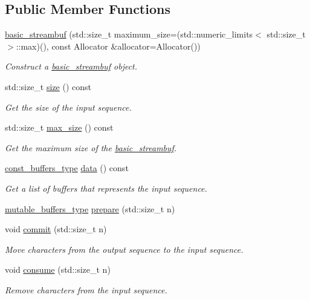 \subsection*{Public Member Functions}
\begin{DoxyCompactItemize}
\item 
\hyperlink{classasio_1_1basic__streambuf_ae170fa1aa36003d7bf294b18d95559a8}{basic\+\_\+streambuf} (std\+::size\+\_\+t maximum\+\_\+size=(std\+::numeric\+\_\+limits$<$ std\+::size\+\_\+t $>$\+::max)(), const Allocator \&allocator=Allocator())
\begin{DoxyCompactList}\small\item\em Construct a \hyperlink{classasio_1_1basic__streambuf}{basic\+\_\+streambuf} object. \end{DoxyCompactList}\item 
std\+::size\+\_\+t \hyperlink{classasio_1_1basic__streambuf_a18183b8bfcb9a7cda8c467c80d578e69}{size} () const 
\begin{DoxyCompactList}\small\item\em Get the size of the input sequence. \end{DoxyCompactList}\item 
std\+::size\+\_\+t \hyperlink{classasio_1_1basic__streambuf_aee4f81154657df05c5c01cc732fe8a3a}{max\+\_\+size} () const 
\begin{DoxyCompactList}\small\item\em Get the maximum size of the \hyperlink{classasio_1_1basic__streambuf}{basic\+\_\+streambuf}. \end{DoxyCompactList}\item 
\hyperlink{classasio_1_1basic__streambuf_a6318f8e7cef616d25207918033f02bc9}{const\+\_\+buffers\+\_\+type} \hyperlink{classasio_1_1basic__streambuf_a0bcecbf99eb1d32613738a73db9de4c9}{data} () const 
\begin{DoxyCompactList}\small\item\em Get a list of buffers that represents the input sequence. \end{DoxyCompactList}\item 
\hyperlink{classasio_1_1basic__streambuf_a4d2090a05e1d13270b4e30d848517272}{mutable\+\_\+buffers\+\_\+type} \hyperlink{classasio_1_1basic__streambuf_a4f19d44bcf40de432f9e6984df959e73}{prepare} (std\+::size\+\_\+t n)
\item 
void \hyperlink{classasio_1_1basic__streambuf_a6d01805ae2a9382cbb81934111c8ea1c}{commit} (std\+::size\+\_\+t n)
\begin{DoxyCompactList}\small\item\em Move characters from the output sequence to the input sequence. \end{DoxyCompactList}\item 
void \hyperlink{classasio_1_1basic__streambuf_a83ca4bad37c9c96f72eda6c8ef133df4}{consume} (std\+::size\+\_\+t n)
\begin{DoxyCompactList}\small\item\em Remove characters from the input sequence. \end{DoxyCompactList}\end{DoxyCompactItemize}
